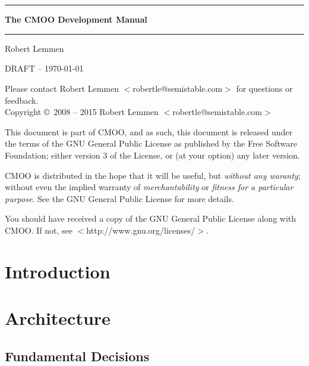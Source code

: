 \documentclass[12pt,a4paper]{article}
\begin{document}
\thispagestyle{empty}
~\\~\vspace{3cm}
\begin{center}
\rule{\textwidth}{1.5pt}\vspace{8mm}
{\Huge\bf The CMOO Development Manual}\vspace{4mm}
\rule{\textwidth}{1.5pt}\vspace{10mm}
{\large Robert Lemmen}
\end{center}
\clearpage

\thispagestyle{empty}
DRAFT -- \today

Please contact Robert Lemmen $<$robertle@semistable.com$>$ for questions or
feedback.
\\
Copyright \copyright~2008 -- 2015 Robert Lemmen $<$robertle@semistable.com$>$

This document is part of CMOO, and as such, this document is released under the terms of the GNU General Public License as published by the Free Software Foundation; either version 3 of the License, or (at your option) any later version.

CMOO is distributed in the hope that it will be useful, but {\em without any
waranty}; without even the implied warranty of {\em merchantability} or {\em
fitness for a particular purpose}.  See the GNU General Public License for more details.

You should have received a copy of the GNU General Public License along with
CMOO. If not, see $<$http://www.gnu.org/licenses/$>$.
\cleardoublepage

\tableofcontents
\cleardoublepage

\cleardoublepage

\section{Introduction}\label{sec:introduction}


\section{Architecture}\label{sec:architecture}

\subsection{Fundamental Decisions}\label{sec:fundamental_decisions}
\end{document}
